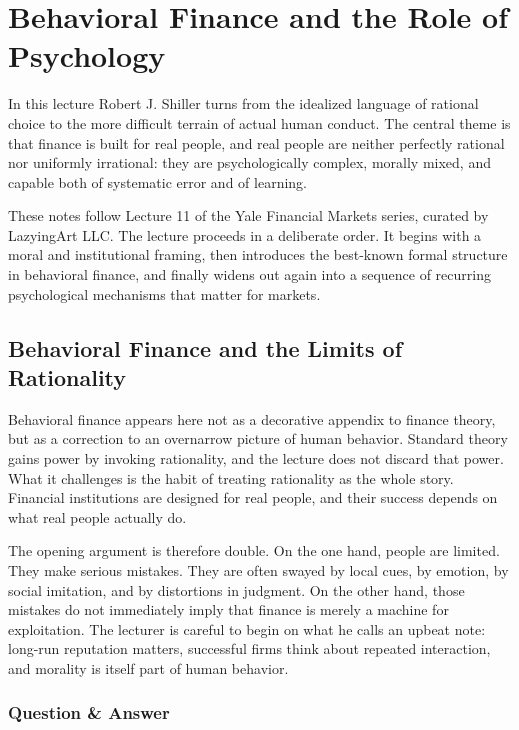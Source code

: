 \chapter{Behavioral Finance and the Role of Psychology}

In this lecture Robert J. Shiller turns from the idealized language of rational choice to the more difficult terrain of actual human conduct. The central theme is that finance is built for real people, and real people are neither perfectly rational nor uniformly irrational: they are psychologically complex, morally mixed, and capable both of systematic error and of learning.

These notes follow Lecture 11 of the Yale Financial Markets series, curated by LazyingArt LLC. The lecture proceeds in a deliberate order. It begins with a moral and institutional framing, then introduces the best-known formal structure in behavioral finance, and finally widens out again into a sequence of recurring psychological mechanisms that matter for markets.

\section{Behavioral Finance and the Limits of Rationality}

Behavioral finance appears here not as a decorative appendix to finance theory, but as a correction to an overnarrow picture of human behavior. Standard theory gains power by invoking rationality, and the lecture does not discard that power. What it challenges is the habit of treating rationality as the whole story. Financial institutions are designed for real people, and their success depends on what real people actually do.

The opening argument is therefore double. On the one hand, people are limited. They make serious mistakes. They are often swayed by local cues, by emotion, by social imitation, and by distortions in judgment. On the other hand, those mistakes do not immediately imply that finance is merely a machine for exploitation. The lecturer is careful to begin on what he calls an upbeat note: long-run reputation matters, successful firms think about repeated interaction, and morality is itself part of human behavior.

\subsection{Question \& Answer}

